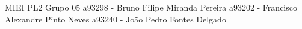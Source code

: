 M\+I\+EI P\+L2 Grupo 05 a93298 -\/ Bruno Filipe Miranda Pereira a93202 -\/ Francisco Alexandre Pinto Neves a93240 -\/ João Pedro Fontes Delgado 